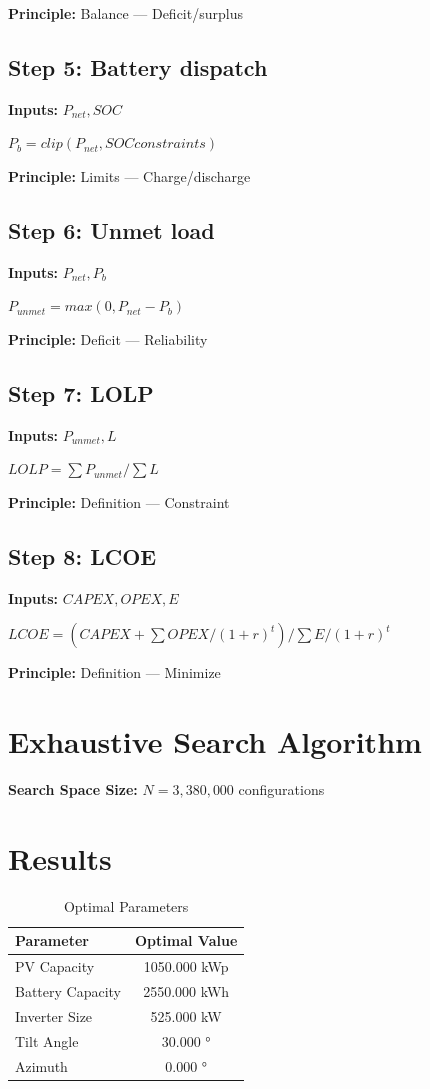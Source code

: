 \documentclass[11pt,twocolumn]{article}
\begin{document}
\textbf{Principle:} Balance --- Deficit/surplus

\subsection*{Step 5: Battery dispatch}
\textbf{Inputs:} $P_{net}, SOC$

$P_b = clip(P_{net}, SOC constraints)$

\textbf{Principle:} Limits --- Charge/discharge

\subsection*{Step 6: Unmet load}
\textbf{Inputs:} $P_{net}, P_b$

$P_{unmet} = max(0, P_{net} - P_b)$

\textbf{Principle:} Deficit --- Reliability

\subsection*{Step 7: LOLP}
\textbf{Inputs:} $P_{unmet}, L$

$LOLP = \sum P_{unmet} / \sum L$

\textbf{Principle:} Definition --- Constraint

\subsection*{Step 8: LCOE}
\textbf{Inputs:} $CAPEX, OPEX, E$

$LCOE = (CAPEX + \sum OPEX/(1+r)^t) / \sum E/(1+r)^t$

\textbf{Principle:} Definition --- Minimize


\section{Exhaustive Search Algorithm}

\textbf{Search Space Size:} $N = 3,380,000$ configurations

\section{Results}

\begin{table}[h]
\centering
\caption{Optimal Parameters}
\begin{tabular}{@{}lc@{}}
\toprule
Parameter & Optimal Value \\
\midrule
PV Capacity & 1050.000 kWp \\
Battery Capacity & 2550.000 kWh \\
Inverter Size & 525.000 kW \\
Tilt Angle & 30.000 ° \\
Azimuth & 0.000 ° \\
\bottomrule
\end{tabular}
\end{table}
\end{document}
